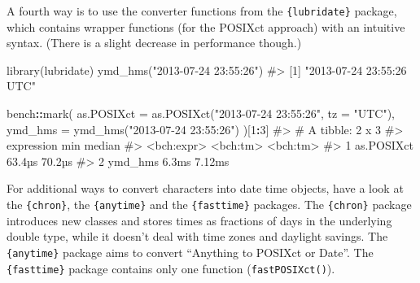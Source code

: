 \documentclass[
]{krantz}
\makeatletter
\newenvironment{Shaded}{\begin{snugshade}}{\end{snugshade}}
\newcommand{\CommentTok}[1]{\textcolor[rgb]{0.56,0.35,0.01}{\textit{#1}}}
\newcommand{\DataTypeTok}[1]{\textcolor[rgb]{0.13,0.29,0.53}{#1}}
\newcommand{\DecValTok}[1]{\textcolor[rgb]{0.00,0.00,0.81}{#1}}
\newcommand{\KeywordTok}[1]{\textcolor[rgb]{0.13,0.29,0.53}{\textbf{#1}}}
\newcommand{\NormalTok}[1]{#1}
\newcommand{\OperatorTok}[1]{\textcolor[rgb]{0.81,0.36,0.00}{\textbf{#1}}}
\newcommand{\StringTok}[1]{\textcolor[rgb]{0.31,0.60,0.02}{#1}}
\newenvironment{kframe}{%
\medskip{}
\setlength{\fboxsep}{.8em}
 \def\at@end@of@kframe{}%
 \ifinner\ifhmode%
  \def\at@end@of@kframe{\end{minipage}}%
  \begin{minipage}{\columnwidth}%
 \fi\fi%
 \def\FrameCommand##1{\hskip\@totalleftmargin \hskip-\fboxsep
 \colorbox{shadecolor}{##1}\hskip-\fboxsep
     \hskip-\linewidth \hskip-\@totalleftmargin \hskip\columnwidth}%
 \MakeFramed {\advance\hsize-\width
   \@totalleftmargin\z@ \linewidth\hsize
   \@setminipage}}%
 {\par\unskip\endMakeFramed%
 \at@end@of@kframe}
\renewenvironment{Shaded}{\begin{kframe}}{\end{kframe}}
\renewcommand{\KeywordTok} [1]{\textcolor[rgb]{0.00,0.44,0.13}{{#1}}}
\renewcommand{\DataTypeTok}[1]{\textcolor[rgb]{0.56,0.13,0.00}{{#1}}}
\renewcommand{\DecValTok}  [1]{\textcolor[rgb]{0.25,0.63,0.44}{{#1}}}
\renewcommand{\StringTok}  [1]{\textcolor[rgb]{0.25,0.44,0.63}{{#1}}}
\renewcommand{\CommentTok} [1]{\textcolor[rgb]{0.38,0.63,0.69}{{#1}}}
\renewcommand{\NormalTok}  [1]{{#1}}
\makeatother
\begin{document}
\begin{Shaded}
\end{Shaded}

A fourth way is to use the converter functions from the \texttt{\{lubridate\}} package, which contains wrapper functions (for the POSIXct approach) with an intuitive syntax. (There is a slight decrease in performance though.)

\begin{Shaded}
\begin{Highlighting}[]
\KeywordTok{library}\NormalTok{(lubridate)}
\KeywordTok{ymd_hms}\NormalTok{(}\StringTok{"2013-07-24 23:55:26"}\NormalTok{)}
\CommentTok{#> [1] "2013-07-24 23:55:26 UTC"}

\NormalTok{bench}\OperatorTok{::}\KeywordTok{mark}\NormalTok{(}
  \DataTypeTok{as.POSIXct =} \KeywordTok{as.POSIXct}\NormalTok{(}\StringTok{"2013-07-24 23:55:26"}\NormalTok{, }\DataTypeTok{tz =} \StringTok{"UTC"}\NormalTok{),}
  \DataTypeTok{ymd_hms =} \KeywordTok{ymd_hms}\NormalTok{(}\StringTok{"2013-07-24 23:55:26"}\NormalTok{)}
\NormalTok{)[}\DecValTok{1}\OperatorTok{:}\DecValTok{3}\NormalTok{]}
\CommentTok{#> # A tibble: 2 x 3}
\CommentTok{#>   expression      min   median}
\CommentTok{#>   <bch:expr> <bch:tm> <bch:tm>}
\CommentTok{#> 1 as.POSIXct   63.4µs   70.2µs}
\CommentTok{#> 2 ymd_hms       6.3ms   7.12ms}
\end{Highlighting}
\end{Shaded}

For additional ways to convert characters into date time objects, have a look at the \texttt{\{chron\}}, the \texttt{\{anytime\}} and the \texttt{\{fasttime\}} packages. The \texttt{\{chron\}} package introduces new classes and stores times as fractions of days in the underlying double type, while it doesn't deal with time zones and daylight savings. The \texttt{\{anytime\}} package aims to convert ``Anything to POSIXct or Date''. The \texttt{\{fasttime\}} package contains only one function (\texttt{fastPOSIXct()}).
\end{document}
